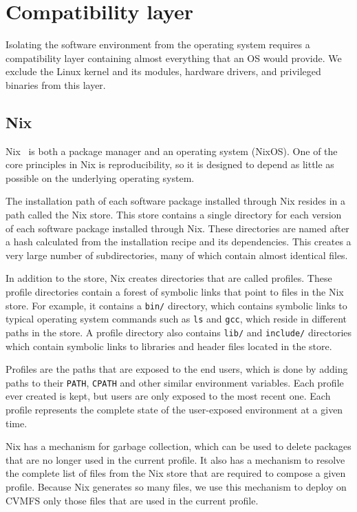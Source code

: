 \documentclass[sigconf]{acmart}
\begin{document}
\section{Compatibility layer}
\label{sec:Compatibility_layer}
Isolating the software environment from the operating system requires a compatibility layer containing almost everything that an OS would provide. We exclude the Linux kernel and its modules, hardware drivers, and privileged binaries from this layer.

\subsection{Nix}
\label{sub:Nix}
Nix~\cite{Nix} is both a package manager and an operating system (NixOS). One of the core principles in Nix is reproducibility, so it is designed to depend as little as possible on the underlying operating system. 

The installation path of each software package installed through Nix resides in a path called the Nix store. This store contains a single directory for each version of each software package installed through Nix. These directories are named after a hash calculated from the installation recipe and its dependencies. This creates a very large number of subdirectories, many of which contain almost identical files. 

In addition to the store, Nix creates directories that are called profiles. These profile directories contain a forest of symbolic links that point to files in the Nix store. For example, it contains a \texttt{bin/} directory, which contains symbolic links to typical operating system commands such as \texttt{ls} and \texttt{gcc}, which reside in different paths in the store. A profile directory also contains \texttt{lib/} and \texttt{include/} directories which contain symbolic links to libraries and header files located in the store. 

Profiles are the paths that are exposed to the end users, which is done by adding paths to their \texttt{PATH}, \texttt{CPATH} and other similar environment variables. Each profile ever created is kept, but users are only exposed to the most recent one. Each profile represents the complete state of the user-exposed environment at a given time.

Nix has a mechanism for garbage collection, which can be used to delete packages that are no longer used in the current profile. It also has a mechanism to resolve the complete list of files from the Nix store that are required to compose a given profile. Because Nix generates so many files, we use this mechanism to deploy on CVMFS only those files that are used in the current profile. 
\end{document}
